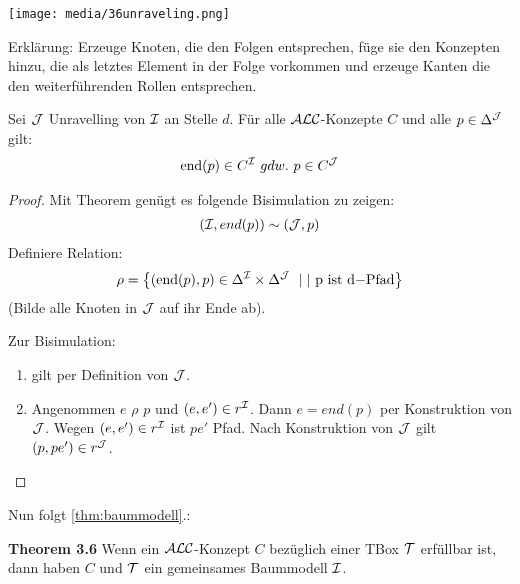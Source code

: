 \texttt{[image: media/36unraveling.png]}

Erklärung: Erzeuge Knoten, die den Folgen entsprechen, füge sie den
Konzepten hinzu, die als letztes Element in der Folge vorkommen und
erzeuge Kanten die den weiterführenden Rollen entsprechen.

\begin{lemma}[Unravelling]
    \label{lemma37}
    \label{lem:unravelling}
Sei $\mathcal{J}$ Unravelling von $\mathcal{I}$ an Stelle $d$. Für alle $\mathcal{A}\mathcal{L}\mathcal{C}$-Konzepte $C$ und alle $p \in \Delta^{\mathcal{J}}$ gilt:
\begin{align*}
\text{end}\left( p \right) \in C^\MI\ gdw.\ p \in C^{\MJ}
\end{align*}
\end{lemma}

\begin{tafel}
\begin{proof}
Mit Theorem genügt es folgende Bisimulation zu zeigen:
\begin{align*}
\left( \MI,end\left( p \right) \right)\sim\left( \MJ,p \right)\\
\end{align*}
Definiere Relation:
\begin{align*}
\rho = \left\{ \left( \text{end}\left( p \right),p \right) \in \Delta^\MI
        \times \Delta^{\MJ}\  \mid|\text{\ p\ }\mathrm{\text{ist}}\text{\ d}\mathrm{- Pfad}\right\}
\end{align*}
(Bilde alle Knoten in $\mathcal{J}$ auf ihr Ende ab). 

Zur Bisimulation:
\begin{enumerate}
\item gilt per Definition von $\mathcal{J}$.
\item
  Angenommen $e$ $\rho$ $p$ und
  $\left( e,e' \right) \in r^\MI$. Dann $e = end\left( p \right)$
  per Konstruktion von $\mathcal{J}$. Wegen $\left( e,e' \right) \in r^\MI$
  ist $pe'$ Pfad. Nach Konstruktion von $\mathcal{J}$ gilt
  $\left( p,pe' \right) \in r^{\MJ}$.
\end{enumerate}
\end{proof}
\end{tafel}

Nun folgt \autoref{thm:baummodell}.:

\textbf{Theorem 3.6} Wenn ein $\mathcal{A}\mathcal{L}\mathcal{C}$-Konzept $C$ bezüglich einer TBox $\mathcal{T}$ erfüllbar ist, dann haben $C$ und $\mathcal{T}$ ein gemeinsames Baummodell $\mathcal{I}$.

